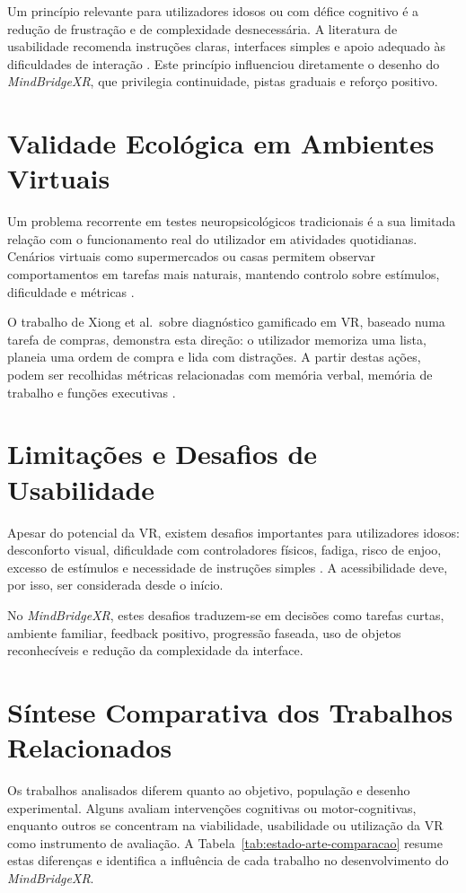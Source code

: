 \documentclass[12pt,a4paper,oneside]{report}
\begin{document}
Um princípio relevante para utilizadores idosos ou com défice cognitivo é a redução de frustração e de complexidade desnecessária. A literatura de usabilidade recomenda instruções claras, interfaces simples e apoio adequado às dificuldades de interação \cite{tuena2020,yun2020}. Este princípio influenciou diretamente o desenho do \textit{MindBridgeXR}, que privilegia continuidade, pistas graduais e reforço positivo.

\section{Validade Ecológica em Ambientes Virtuais}

Um problema recorrente em testes neuropsicológicos tradicionais é a sua limitada relação com o funcionamento real do utilizador em atividades quotidianas. Cenários virtuais como supermercados ou casas permitem observar comportamentos em tarefas mais naturais, mantendo controlo sobre estímulos, dificuldade e métricas \cite{xiong2024}.

O trabalho de Xiong et al.\ sobre diagnóstico gamificado em \ac{VR}, baseado numa tarefa de compras, demonstra esta direção: o utilizador memoriza uma lista, planeia uma ordem de compra e lida com distrações. A partir destas ações, podem ser recolhidas métricas relacionadas com memória verbal, memória de trabalho e funções executivas \cite{xiong2024}.

\section{Limitações e Desafios de Usabilidade}

Apesar do potencial da \ac{VR}, existem desafios importantes para utilizadores idosos: desconforto visual, dificuldade com controladores físicos, fadiga, risco de enjoo, excesso de estímulos e necessidade de instruções simples \cite{tuena2020}. A acessibilidade deve, por isso, ser considerada desde o início.

No \textit{MindBridgeXR}, estes desafios traduzem-se em decisões como tarefas curtas, ambiente familiar, feedback positivo, progressão faseada, uso de objetos reconhecíveis e redução da complexidade da interface.

\section{Síntese Comparativa dos Trabalhos Relacionados}

Os trabalhos analisados diferem quanto ao objetivo, população e desenho experimental. Alguns avaliam intervenções cognitivas ou motor-cognitivas, enquanto outros se concentram na viabilidade, usabilidade ou utilização da \ac{VR} como instrumento de avaliação. A Tabela~\ref{tab:estado-arte-comparacao} resume estas diferenças e identifica a influência de cada trabalho no desenvolvimento do \textit{MindBridgeXR}.
\end{document}
